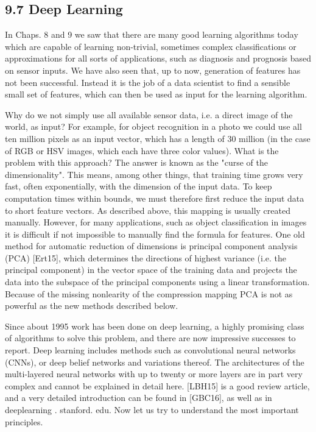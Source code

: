 \documentclass[10pt]{article}
\begin{document}
\subsection*{9.7 Deep Learning}
In Chaps. 8 and 9 we saw that there are many good learning algorithms today which are capable of learning non-trivial, sometimes complex classifications or approximations for all sorts of applications, such as diagnosis and prognosis based on sensor inputs. We have also seen that, up to now, generation of features has not been successful. Instead it is the job of a data scientist to find a sensible small set of features, which can then be used as input for the learning algorithm.

Why do we not simply use all available sensor data, i.e. a direct image of the world, as input? For example, for object recognition in a photo we could use all ten million pixels as an input vector, which has a length of 30 million (in the case of RGB or HSV images, which each have three color values). What is the problem with this approach? The answer is known as the "curse of the dimensionality". This means, among other things, that training time grows very fast, often exponentially, with the dimension of the input data. To keep computation times within bounds, we must therefore first reduce the input data to short feature vectors. As described above, this mapping is usually created manually. However, for many applications, such as object classification in images it is difficult if not impossible to manually find the formula for features. One old method for automatic reduction of dimensions is principal component analysis (PCA) [Ert15], which determines the directions of highest variance (i.e. the principal component) in the vector space of the training data and projects the data into the subspace of the principal components using a linear transformation. Because of the missing nonlearity of the compression mapping PCA is not as powerful as the new methods described below.

Since about 1995 work has been done on deep learning, a highly promising class of algorithms to solve this problem, and there are now impressive successes to report. Deep learning includes methods such as convolutional neural networks (CNNs), or deep belief networks and variations thereof. The architectures of the multi-layered neural networks with up to twenty or more layers are in part very complex and cannot be explained in detail here. [LBH15] is a good review article, and a very detailed introduction can be found in [GBC16], as well as in deeplearning . stanford. edu. Now let us try to understand the most important principles.
\end{document}
